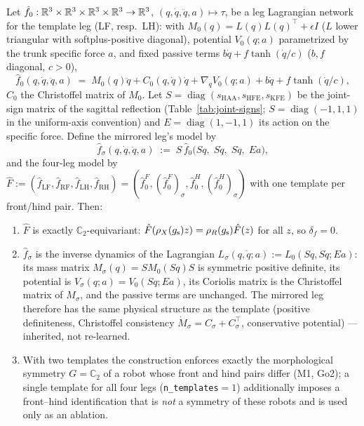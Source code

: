 \begin{proposition}
\label{prop:equiv-delan}
Let $\hat f_0 : \mathbb{R}^{3}\times\mathbb{R}^{3}\times\mathbb{R}^{3}\times\mathbb{R}^{3} \to \mathbb{R}^{3}$,
$(q,\dot q,\ddot q, a) \mapsto \tau$, be a leg Lagrangian network
\cite{lutter2019delan} for the template leg (LF, resp.\ LH): with
$M_0(q) = L(q)L(q)^\top + \epsilon I$ ($L$ lower triangular with
softplus-positive diagonal), potential $V_0(q;a)$ parametrized by the trunk
specific force $a$, and fixed passive terms $b\dot q + f\tanh(\dot q/c)$
($b, f$ diagonal, $c > 0$),
\begin{equation}
  \label{eq:delan-template}
  \hat f_0(q,\dot q,\ddot q,a) \;=\; M_0(q)\ddot q + C_0(q,\dot q)\dot q +
  \nabla_q V_0(q;a) + b\dot q + f\tanh(\dot q/c),
\end{equation}
$C_0$ the Christoffel matrix of $M_0$. Let $S = \operatorname{diag}(s_{\mathrm{HAA}},
s_{\mathrm{HFE}}, s_{\mathrm{KFE}})$ be the joint-sign matrix of the sagittal
reflection (Table~\ref{tab:joint-signs}; $S = \operatorname{diag}(-1,1,1)$
in the uniform-axis convention) and $E = \operatorname{diag}(1,-1,1)$ its
action on the specific force. Define the mirrored leg's model by
\begin{equation}
  \label{eq:mirror-template}
  \hat f_{\sigma}(q,\dot q,\ddot q,a) \;:=\; S\, \hat f_0\bigl(Sq,\; S\dot q,\; S\ddot q,\; Ea\bigr),
\end{equation}
and the four-leg model by $\hat F := (\hat f_{\mathrm{LF}}, \hat f_{\mathrm{RF}},
\hat f_{\mathrm{LH}}, \hat f_{\mathrm{RH}}) = (\hat f_{0}^{F}, (\hat f_0^{F})_\sigma,
\hat f_0^{H}, (\hat f_0^{H})_\sigma)$ with one template per front/hind pair.
Then:
\begin{enumerate}
\item[(i)] $\hat F$ is exactly $\mathbb{C}_2$-equivariant: $\hat F(\rho_{X}(g_{\mathrm{s}})z)
= \rho_{R}(g_{\mathrm{s}})\hat F(z)$ for all $z$, so $\delta_f = 0$.
\item[(ii)] $\hat f_\sigma$ is the inverse dynamics of the Lagrangian
$L_\sigma(q,\dot q;a) := L_0(Sq, S\dot q; Ea)$: its mass matrix
$M_\sigma(q) = S M_0(Sq) S$ is symmetric positive definite, its potential is
$V_\sigma(q;a) = V_0(Sq;Ea)$, its Coriolis matrix is the Christoffel matrix
of $M_\sigma$, and the passive terms are unchanged. The mirrored leg
therefore has the same physical structure as the template (positive
definiteness, Christoffel consistency $\dot M_\sigma = C_\sigma + C_\sigma^\top$,
conservative potential) --- inherited, not re-learned.
\item[(iii)] With two templates the construction enforces exactly the
morphological symmetry $G = \mathbb{C}_2$ of a robot whose front and hind
pairs differ (M1, Go2); a single template for all four legs
(\texttt{n\_templates}$=1$) additionally imposes a front--hind
identification that is \emph{not} a symmetry of these robots and is used
only as an ablation.
\end{enumerate}
\end{proposition}

